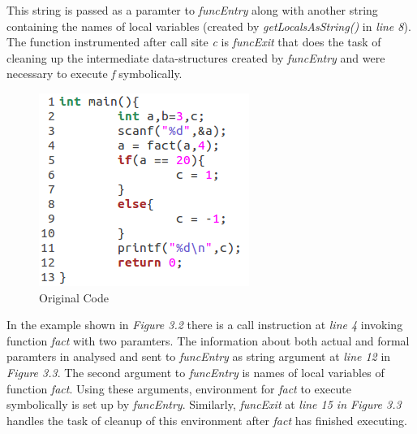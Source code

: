\documentclass[12pt,oneside]{book}
\begin{document}
This string is passed as a paramter to \textit{funcEntry} along with another string containing the names of local variables (created by \textit{getLocalsAsString()} in \textit{line 8}). The function instrumented after call site \textit{c} is \textit{funcExit} that does the task of cleaning up the intermediate data-structures created by \textit{funcEntry} and were necessary to execute \textit{f} symbolically.\\



\vspace{0.4cm}

\begin{figure}[htbp]
\centering
\includegraphics[scale=0.53]{env1_orig.png}
\caption{Original Code}
\end{figure}  

In the example shown in \textit{Figure 3.2} there is a call instruction at \textit{line 4} invoking function \textit{fact} with two paramters. The information about both actual and formal paramters in analysed and sent to \textit{funcEntry} as string argument at \textit{line 12} in \textit{Figure 3.3}. The second argument to \textit{funcEntry} is names of local variables of function \textit{fact}. Using these arguments, environment for \textit{fact} to execute symbolically is set up by \textit{funcEntry}. Similarly, \textit{funcExit} at \textit{line 15 in Figure 3.3} handles the task of cleanup of this environment after \textit{fact} has finished executing.
\end{document}
